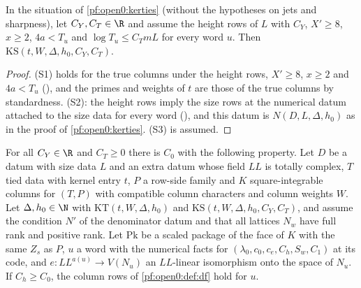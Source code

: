 \begin{proposition}\label{pf:open0:kersizes}
In the situation of \cref{pf:open0:kerties} (without the hypotheses on jets and sharpness), let $C_Y,C_T\in\R$ and assume the
height rows of $L$ with $C_Y$, $X'\ge8$, $x\ge2$, $4a<T_u$ and $\log T_u\le C_TmL$ for every word $u$. Then
$\mathrm{KS}(t,W,\Delta,h_0,C_Y,C_T)$.
\end{proposition}

\begin{proof}
(S1) holds for the true columns under the height rows, $X'\ge8$, $x\ge2$ and $4a<T_u$
(), and the primes and weights of $t$ are those of the true columns by
standardness. (S2): the height rows imply the size rows at the numerical datum attached to the size data for every word
(), and this datum is $N(D,L,\Delta,h_0)$ as in the proof
of \cref{pf:open0:kerties}. (S3) is assumed.
\end{proof}

\begin{theorem}\label{pf:open0:kercols}
For all $C_Y\in\R$ and $C_T\ge0$ there is $C_0$ with the following property. Let $D$ be a datum with size data $L$ and an extra
datum whose field $\mathit{LL}$ is totally complex, $T$ tied data with kernel entry $t$, $P$ a row-side family and $K$
square-integrable columns for $(T,P)$ with compatible column characters and column weights $W$. Let $\Delta,h_0\in\N$ with
$\mathrm{KT}(t,W,\Delta,h_0)$ and $\mathrm{KS}(t,W,\Delta,h_0,C_Y,C_T)$, and assume the condition $N'$ of the denominator datum and
that all lattices $N_w$ have full rank and positive rank. Let $\mathrm{Pk}$ be a scaled package of the face of $K$ with the same
$Z_s$ as $P$, $u$ a word with the numerical facts for $(\lambda_0,c_0,c_e,C_h,S_w,C_1)$ at its code, and
$e\colon\mathit{LL}^{a(u)}\to V(N_u)$ an $\mathit{LL}$-linear isomorphism onto the space of $N_u$. If $C_h\ge C_0$, the column rows of
\cref{pf:open0:def:df} hold for $u$.
\ \
\ \
\ \
\end{theorem}

